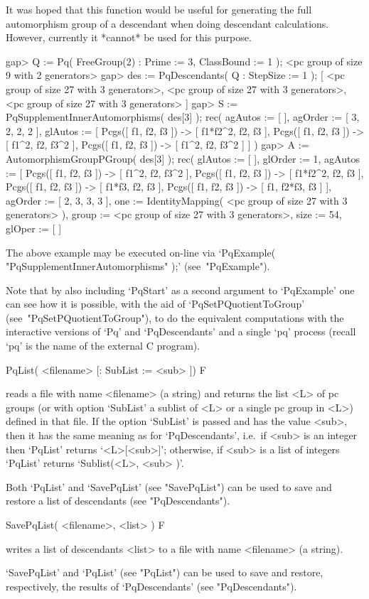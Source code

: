 It was hoped that this function would be useful for generating  the  full
automorphism group of a descendant when  doing  descendant  calculations.
However, currently it *cannot* be used for this purpose.

\beginexample
gap> Q := Pq( FreeGroup(2) : Prime := 3, ClassBound := 1 );
<pc group of size 9 with 2 generators>
gap> des := PqDescendants( Q : StepSize := 1 );
[ <pc group of size 27 with 3 generators>, 
  <pc group of size 27 with 3 generators>, 
  <pc group of size 27 with 3 generators> ]
gap> S := PqSupplementInnerAutomorphisms( des[3] );
rec( agAutos := [  ], agOrder := [ 3, 2, 2, 2 ], 
  glAutos := [ Pcgs([ f1, f2, f3 ]) -> [ f1*f2^2, f2, f3 ], 
      Pcgs([ f1, f2, f3 ]) -> [ f1^2, f2, f3^2 ], 
      Pcgs([ f1, f2, f3 ]) -> [ f1^2, f2, f3^2 ] ] )
gap> A := AutomorphismGroupPGroup( des[3] );
rec( glAutos := [  ], glOrder := 1, 
  agAutos := [ Pcgs([ f1, f2, f3 ]) -> [ f1^2, f2, f3^2 ], 
      Pcgs([ f1, f2, f3 ]) -> [ f1*f2^2, f2, f3 ], 
      Pcgs([ f1, f2, f3 ]) -> [ f1*f3, f2, f3 ], 
      Pcgs([ f1, f2, f3 ]) -> [ f1, f2*f3, f3 ] ], agOrder := [ 2, 3, 3, 3 ], 
  one := IdentityMapping( <pc group of size 27 with 3 generators> ), 
  group := <pc group of size 27 with 3 generators>, size := 54, 
  glOper := [  ]
\endexample

The   above   example   may   be   executed   on-line   via   `PqExample(
"PqSupplementInnerAutomorphisms" );' (see~"PqExample"). 

Note that by also including `PqStart' as a second argument to `PqExample'
one can see how it is possible, with the aid  of  `PqSetPQuotientToGroup'
(see~"PqSetPQuotientToGroup"), to do the equivalent computations with the
interactive versions of  `Pq'  and  `PqDescendants'  and  a  single  `pq'
process (recall `pq' is the name of the external C program).

\>PqList( <filename> [: SubList := <sub> ]) F

reads a file with name <filename> (a string) and returns the list <L>  of
pc groups (or with option `SubList' a sublist of <L> or a single pc group
in <L>) defined in that file. If the option `SubList' is passed  and  has
the value <sub>, then it has the same  meaning  as  for  `PqDescendants',
i.e.~if  <sub>  is  an  integer  then  `PqList'   returns   `<L>[<sub>]';
otherwise, if <sub> is a list of integers `PqList' returns  `Sublist(<L>,
<sub> )'.

Both `PqList' and `SavePqList' (see "SavePqList") can be used to save and
restore a list of descendants (see "PqDescendants").

\>SavePqList( <filename>, <list> ) F

writes a list of descendants <list> to a file  with  name  <filename>  (a
string).

`SavePqList' and `PqList' (see "PqList") can be used to save and restore,
respectively, the results of `PqDescendants' (see "PqDescendants").

